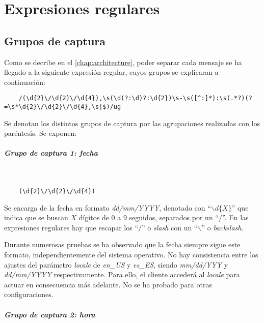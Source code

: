 \chapter{Expresiones regulares} \label{chap:regex}

\section{Grupos de captura}

Como se decribe en el \autoref{chap:architecture}, poder separar cada mensaje se ha llegado a la siguiente expresión regular, cuyos grupos se explicaran a continuación:

\begin{lstlisting}
	/(\d{2}\/\d{2}\/\d{4}),\s(\d(?:\d)?:\d{2})\s-\s([^:]*):\s(.*?)(?=\s*\d{2}\/\d{2}\/\d{4},\s|$)/ug
\end{lstlisting}

Se denotan los distintos grupos de captura por las agrupaciones realizadas con los paréntesis. Se exponen:

\paragraph{Grupo de captura 1: fecha}\mbox{}\\

\begin{lstlisting}
	(\d{2}\/\d{2}\/\d{4})
\end{lstlisting}

Se encarga de la fecha en formato \textit{dd/mm/YYYY}, denotado con ``$\backslash d\{X\}$'' que indica que se buscan $X$ dígitos de $0$ a $9$ seguidos, separados por un ``$/$''. En las expresiones regulares hay que escapar los ``$/$'' o \textit{slash} con un ``$\backslash$'' o \textit{backslash}.

Durante numerosas pruebas se ha observado que la fecha siempre sigue este formato, independientemente del sistema operativo. No hay consistencia entre los ajustes del parámetro \textit{locale} de \textit{en\_US} y \textit{es\_ES}, siendo \textit{mm/dd/YYY} y \textit{dd/mm/YYYY} respectivamente. Para ello, el cliente accederá al \textit{locale} para actuar en consecuencia más adelante. No se ha probado para otras configuraciones.

\paragraph{Grupo de captura 2: hora}\mbox{}\\

